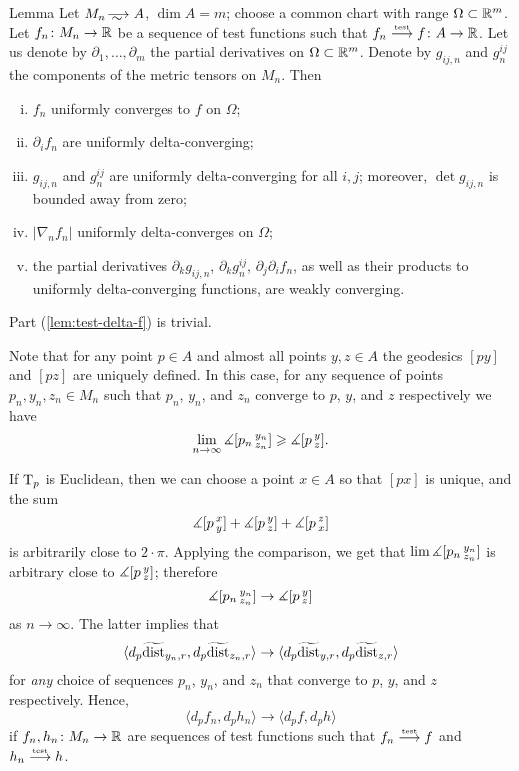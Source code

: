 \begin{thm}{Lemma}\label{lem:test-delta}
Let $M_n\smooths{} A$, $\dim A=m$;
choose a common chart with range $\Omega\subset \mathbb{R}^m$.
Let $f_n\colon M_n\to\mathbb{R}$ be a sequence of test functions such that $f_n\zz\testto f\:A\to \RR$.
Let us denote by $\partial_1,\dots,\partial_m$ the partial derivatives on $\Omega\subset \mathbb{R}^m$.
Denote by $g_{ij,n}$ and $g^{ij}_n$ the components of the metric tensors on $M_n$.
Then 
\begin{enumerate}[(i)]
\item\label{lem:test-delta-f} $f_n$ uniformly converges to $f$ on $\Omega$;
\item\label{lem:test-delta-partial} $\partial_if_n$ are uniformly delta-converging;
\item\label{lem:test-delta-g}  $g_{ij,n}$ and $g^{ij}_n$ are uniformly delta-converging for all $i,j$;
moreover, $\det g_{ij,n}$ is bounded away from zero;
\item\label{lem:test-delta|nabla|} $|\nabla_n f_n|$ uniformly delta-converges on $\Omega$; %
\item\label{lem:test-delta-partial-g} the partial derivatives $\partial_kg_{ij,n}$, $\partial_k g^{ij}_n$,  $\partial_j\partial_if_n$, as well as their products to uniformly delta-converging functions,  are weakly converging.
\end{enumerate}

\end{thm}

 Part (\ref{lem:test-delta-f}) is trivial.

Note that for any point $p\in A$ and almost all points $y,z\in A$ the geodesics $[py]$ and $[pz]$ are uniquely defined.
In this case, for any sequence of points $p_n,y_n,z_n\in M_n$ such that $p_n$, $y_n$, and $z_n$ converge to $p$, $y$, and $z$ respectively we have
\[\lim_{n\to\infty}\measuredangle [p_n\,{}^{y_n}_{z_n}]\geqslant \measuredangle [p\,{}^{y}_{z}].\]

If $\mathrm{T}_p$ is Euclidean, then we can choose a point $x\in A$ so that $[px]$ is unique, and the sum 
\[\measuredangle [p\,{}^{x}_{y}]+\measuredangle [p\,{}^{y}_{z}]+\measuredangle [p\,{}^{z}_{x}]\]
is arbitrarily close to $2\cdot\pi$.
Applying the comparison, we get that $\lim\measuredangle [p_n\,{}^{y_n}_{z_n}]$ is arbitrary close to $\measuredangle [p\,{}^{y}_{z}]$; therefore
\[\measuredangle [p_n\,{}^{y_n}_{z_n}]\to\measuredangle [p\,{}^{y}_{z}]\]
as $n\to\infty$.
The latter implies that
\[\langle d_p\widetilde{\operatorname{\rm dist}}_{y_n,r},d_p\widetilde{\operatorname{\rm dist}}_{z_n,r}\rangle\to \langle d_p\widetilde{\operatorname{\rm dist}}_{y,r},d_p\widetilde{\operatorname{\rm dist}}_{z,r}\rangle\]
for \emph{any} choice of sequences $p_n$, $y_n$, and $z_n$ that converge to $p$, $y$, and $z$ respectively.
Hence,
\[\langle d_pf_n,d_ph_n\rangle\to \langle d_pf,d_ph\rangle\]
if $f_n,h_n\colon M_n\to\mathbb{R}$ are sequences of test functions such that $f_n\stackrel{\text{\tiny\rm test}}{\longrightarrow} f$ and $h_n\stackrel{\text{\tiny\rm test}}{\longrightarrow} h$.

